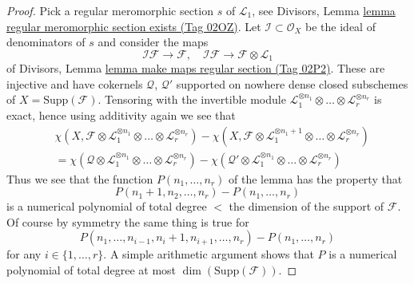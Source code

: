 \documentclass{amsart}
\theoremstyle{plain}
\theoremstyle{definition}
\theoremstyle{remark}
\numberwithin{equation}{subsection}
\begin{document}
\begin{proof}
\medskip\noindent
Pick a regular meromorphic section $s$ of $\mathcal{L}_1$, see
Divisors, Lemma \href{https://stacks.math.columbia.edu/tag/02OZ}{lemma regular meromorphic section exists (Tag 02OZ)}.
Let $\mathcal{I} \subset \mathcal{O}_X$ be the ideal of
denominators of $s$ and consider the maps
$$
\mathcal{I}\mathcal{F} \to \mathcal{F},\quad
\mathcal{I}\mathcal{F} \to \mathcal{F} \otimes \mathcal{L}_1
$$
of Divisors, Lemma \href{https://stacks.math.columbia.edu/tag/02P2}{lemma make maps regular section (Tag 02P2)}.
These are injective and have cokernels $\mathcal{Q}$, $\mathcal{Q}'$
supported on nowhere dense closed subschemes of $X = \text{Supp}(\mathcal{F})$.
Tensoring with the invertible module
$\mathcal{L}_1^{\otimes n_1} \otimes \ldots \otimes \mathcal{L}_r^{\otimes n_r}$
is exact, hence using additivity again
we see that
\begin{align*}
&\chi(X, \mathcal{F} \otimes \mathcal{L}_1^{\otimes n_1} \otimes \ldots \otimes
\mathcal{L}_r^{\otimes n_r}) -
\chi(X, \mathcal{F} \otimes \mathcal{L}_1^{\otimes n_1 + 1}
\otimes \ldots \otimes \mathcal{L}_r^{\otimes n_r}) \\
& =
\chi(\mathcal{Q} \otimes \mathcal{L}_1^{\otimes n_1} \otimes \ldots \otimes
\mathcal{L}_r^{\otimes n_r}) -
\chi(\mathcal{Q}' \otimes \mathcal{L}_1^{\otimes n_1} \otimes \ldots \otimes
\mathcal{L}_r^{\otimes n_r})
\end{align*}
Thus we see that the function $P(n_1, \ldots, n_r)$ of the lemma has
the property that
$$
P(n_1 + 1, n_2, \ldots, n_r) - P(n_1, \ldots, n_r)
$$
is a numerical polynomial of total degree $<$ the dimension
of the support of $\mathcal{F}$. Of course by symmetry the same
thing is true for
$$
P(n_1, \ldots, n_{i - 1}, n_i + 1, n_{i + 1}, \ldots, n_r)
- P(n_1, \ldots, n_r)
$$
for any $i \in \{1, \ldots, r\}$. A simple arithmetic argument shows
that $P$ is a numerical polynomial of total degree at most
$\dim(\text{Supp}(\mathcal{F}))$.
\end{proof}
\end{document}
